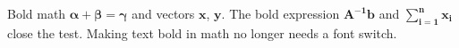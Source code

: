 \documentclass{article}
\begin{document}
Bold math $\bm{\alpha}+\bm{\beta}=\bm{\gamma}$ and vectors $\bm{x}$, $\bm{y}$.
The bold expression $\bm{A^{-1}b}$ and $\bm{\sum_{i=1}^n x_i}$ close the test.
Making text bold in math no longer needs a font switch.
\end{document}
